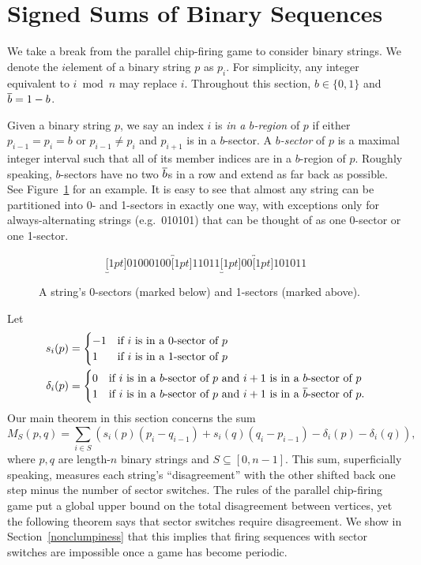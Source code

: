 \section{Signed Sums of Binary Sequences}\label{binSeq}
We take a break from the parallel chip-firing game to consider binary
strings. We denote the $i$\xth element of a binary string $p$ as $p_i$. For
simplicity, any integer equivalent to $i \bmod n$ may replace $i$. Throughout
this section, $b \in \{0,1\}$ and $\overline{b} = 1-b$.

Given a binary string $p$, we say an index $i$ is \emph{in a $b$-region} of $p$
if either $p_{i-1} = p_i = b$ or $p_{i-1} \neq p_i$ and $p_{i+1}$ is in a
$b$-sector. A \emph{$b$-sector} of $p$ is a maximal integer interval such that
all of its member indices are in a $b$-region of $p$. Roughly speaking,
$b$-sectors have no two $\overline{b}$s in a row and extend as far back as possible.
See Figure~\ref{sectorEx} for an example. It is easy to see that almost any
string can be partitioned into 0- and 1-sectors in exactly one way, with
exceptions only for always-alternating strings (e.g.\ 010101) that can be
thought of as one 0-sector or one 1-sector.

\begin{figure}
  \[
    \underbracket[1pt]{01000100}\overbracket[1pt]{11011}\underbracket[1pt]{00}
    \overbracket[1pt]{101011}
  \]
  \caption{A string's 0-sectors (marked below) and 1-sectors (marked
    above).}
  \label{sectorEx}
\end{figure}

Let
\begin{align*}
  s_i(p) &= \begin{cases}
    -1 & \text{if $i$ is in a 0-sector of $p$} \\
    1 & \text{if $i$ is in a 1-sector of $p$}
  \end{cases} \\
  \delta_i(p) &= \begin{cases}
    0 & \text{if $i$ is in a $b$-sector of $p$ and $i+1$ is in a $b$-sector of
      $p$} \\
    1 & \text{if $i$ is in a $b$-sector of $p$ and $i+1$ is in a
      $\overline{b}$-sector of $p$}.
  \end{cases}
\end{align*}
Our main theorem in this section concerns the sum
\begin{equation}\label{misbsum}
  M_S(p,q) = \sum_{i \in S}(s_i(p)(p_i - q_{i-1}) + s_i(q)(q_i - p_{i-1}) -
  \delta_i(p) - \delta_i(q)),
\end{equation}
where $p,q$ are length-$n$ binary strings and $S \subseteq [0, n-1]$. This sum,
superficially speaking, measures each string's ``disagreement'' with the other
shifted back one step minus the number of sector switches. The rules of the
parallel chip-firing game put a global upper bound on the total disagreement
between vertices, yet the following theorem says that sector switches require
disagreement. We show in Section~\ref{nonclumpiness} that this implies that
firing sequences with sector switches are impossible once a game has become
periodic.

